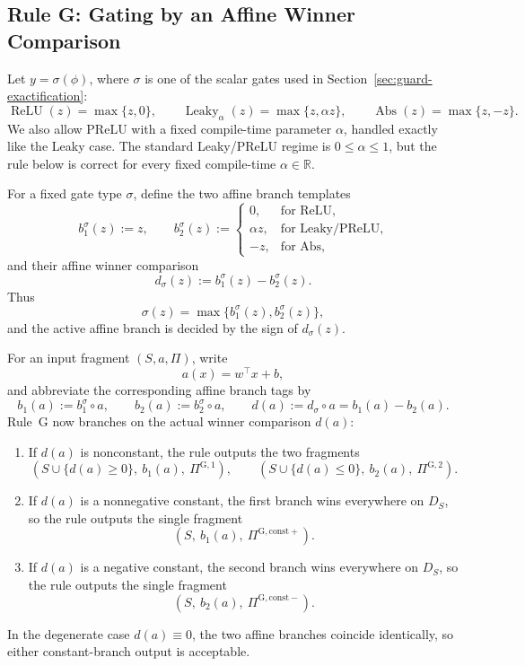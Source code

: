 \subsection{Rule G: Gating by an Affine Winner Comparison}

Let $y=\sigma(\phi)$, where $\sigma$ is one of the scalar gates used in Section~\ref{sec:guard-exactification}:
\[
 \operatorname{ReLU}(z)=\max\{z,0\},
 \qquad
 \operatorname{Leaky}_\alpha(z)=\max\{z,\alpha z\},
 \qquad
 \operatorname{Abs}(z)=\max\{z,-z\}.
\]
We also allow PReLU with a fixed compile-time parameter $\alpha$, handled exactly like the Leaky case. The standard Leaky/PReLU regime is $0\le \alpha\le 1$, but the rule below is correct for every fixed compile-time $\alpha\in\mathbb R$.

For a fixed gate type $\sigma$, define the two affine branch templates
\[
 b_1^\sigma(z):=z,
 \qquad
 b_2^\sigma(z):=
 \begin{cases}
  0, & \text{for ReLU},\\
  \alpha z, & \text{for Leaky/PReLU},\\
  -z, & \text{for Abs},
 \end{cases}
\]
and their affine winner comparison
\[
 d_\sigma(z):=b_1^\sigma(z)-b_2^\sigma(z).
\]
Thus
\[
 \sigma(z)=\max\{b_1^\sigma(z),b_2^\sigma(z)\},
\]
and the active affine branch is decided by the sign of $d_\sigma(z)$.

For an input fragment $(S,a,\Pi)$, write
\[
 a(x)=w^\top x+b,
\]
and abbreviate the corresponding affine branch tags by
\[
 b_1(a):=b_1^\sigma\!\circ a,
 \qquad
 b_2(a):=b_2^\sigma\!\circ a,
 \qquad
 d(a):=d_\sigma\!\circ a=b_1(a)-b_2(a).
\]
Rule~G now branches on the actual winner comparison $d(a)$:
\begin{enumerate}
    \item If $d(a)$ is nonconstant, the rule outputs the two fragments
    \[
    (S\cup\{d(a)\ge 0\},\ b_1(a),\ \Pi^{\mathrm G,1}),
    \qquad
    (S\cup\{d(a)\le 0\},\ b_2(a),\ \Pi^{\mathrm G,2}).
    \]
    \item If $d(a)$ is a nonnegative constant, the first branch wins everywhere on $D_S$, so the rule outputs the single fragment
    \[
    (S,\ b_1(a),\ \Pi^{\mathrm G,\mathrm{const}+}).
    \]
    \item If $d(a)$ is a negative constant, the second branch wins everywhere on $D_S$, so the rule outputs the single fragment
    \[
    (S,\ b_2(a),\ \Pi^{\mathrm G,\mathrm{const}-}).
    \]
\end{enumerate}
In the degenerate case $d(a)\equiv 0$, the two affine branches coincide identically, so either constant-branch output is acceptable.

